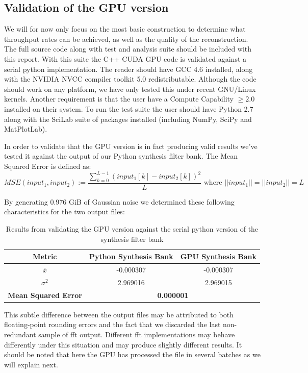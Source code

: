 \documentclass[a4paper,10pt]{article}
\begin{document}
\subsection{Validation of the GPU version}
We will for now only focus on the most basic construction to determine what throughput rates can be achieved, as well as the quality of the reconstruction. The full source code
along with test and analysis suite should be included with this report. With this suite the C++ CUDA GPU code is validated against a serial python implementation. The reader 
should have GCC 4.6 installed, along with the NVIDIA NVCC compiler toolkit 5.0 redistributable. Although the code should work on any platform, we have only tested this under 
recent GNU/Linux kernels. Another requirement is that the user have a Compute Capability $\geq2.0$ installed on their system. To run the test suite the user should have 
Python 2.7 along with the SciLab suite of packages installed (including NumPy, SciPy and MatPlotLab).

In order to validate that the GPU version is in fact producing valid results we've tested it against the output of our Python synthesis filter bank. The Mean Squared Error 
is defined as:
\begin{equation}
 MSE(input_1,input_2) := \frac{\sum_{k=0}^{L-1}{(input_1[k] - input_2[k])^2}}{L} \text{ where } ||input_1|| = ||input_2|| = L
\end{equation}

By generating 0.976 GiB of Gaussian noise we determined these following characteristics for the two output files:
\begin{table}
  \centering
  \begin{tabular}{|c|c|c|}
    \hline
    \textbf{Metric} & \textbf{Python Synthesis Bank} & \textbf{GPU Synthesis Bank} \\
    \hline
    $\bar x$ & -0.000307 & -0.000307 \\
    \hline
    $\sigma^{2}$ & 2.969016 & 2.969015 \\
    \hline
    \textbf{Mean Squared Error} & \multicolumn{2}{|c|}{\textbf{0.000001}} \\
    \hline
  \end{tabular}
  \caption[Validation of the GPU version]{Results from validating the GPU version against the serial python version of the synthesis filter bank}
\end{table}

This subtle difference between the output files may be attributed to both floating-point rounding errors and the fact that we discarded the last non-redundant
sample of \gls{fft} output. Different \gls{fft} implementations may behave differently under this situation and may produce slightly different results. It should be noted
that here the GPU has processed the file in several batches as we will explain next.
\end{document}
